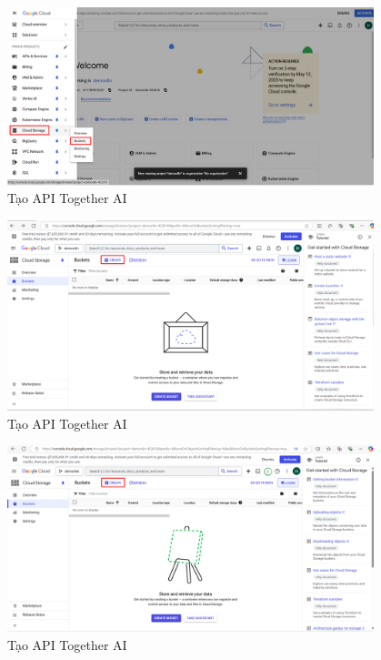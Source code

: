 \begin{itemize}[label=]
\begin{figure}[H]
    \end{figure}
    \begin{figure}[H]
    \centering
    \includegraphics[width=0.95\textwidth]{images/GGcloud-3.png}
    \caption{Tạo API Together AI}
    
    \end{figure}
    \begin{figure}[H]
    \centering
    \includegraphics[width=0.95\textwidth]{images/GGcloud-4.png}
    \caption{Tạo API Together AI}
    
    \end{figure}
    \begin{figure}[H]
    \centering
    \includegraphics[width=0.95\textwidth]{images/GGcloud-5.png}
    \caption{Tạo API Together AI}
    

\end{figure}
\end{itemize}
